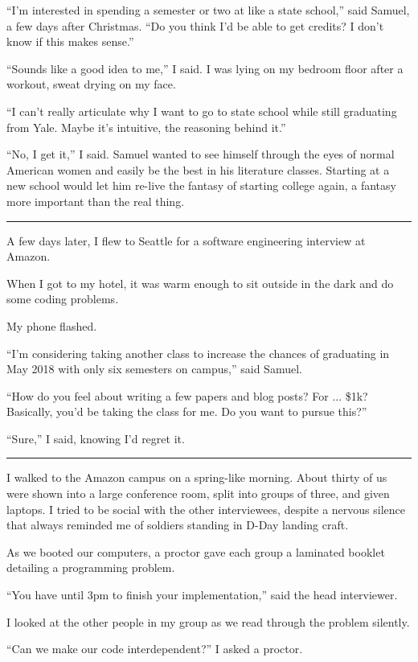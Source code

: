 ``I'm interested in spending a semester or two at like a state school,'' said
Samuel, a few days after Christmas.  ``Do you think I'd be able to get credits?
I don't know if this makes sense.''

``Sounds like a good idea to me,'' I said.  I was lying on my bedroom floor
after a workout, sweat drying on my face.

``I can't really articulate why I want to go to state school while still
graduating from Yale.   Maybe it's intuitive, the reasoning behind it.'' 

``No, I get it,'' I said.  Samuel wanted to see himself through the eyes of
normal American women and easily be the best in his literature classes.
Starting at a new school would let him re-live the fantasy of starting college
again, a fantasy more important than the real thing.

\plainfancybreak{12pt}{2}{* * *}

A few days later, I flew to Seattle for a software engineering interview at
Amazon.

When I got to my hotel, it was warm enough to sit outside in the dark and do
some coding problems.

My phone flashed.

``I'm considering taking another class to increase the chances of graduating in
May 2018 with only six semesters on campus,'' said Samuel.  

``How do you feel about writing a few papers and blog posts?  For ... \$1k?
Basically, you'd be taking the class for me.  Do you want to pursue this?'' 

``Sure,'' I said, knowing I'd regret it.

\plainfancybreak{12pt}{2}{* * *}

I walked to the Amazon campus on a spring-like morning.  About thirty of us were
shown into a large conference room, split into groups of three, and given
laptops.  I tried to be social with the other interviewees, despite a nervous
silence that always reminded me of soldiers standing in D-Day landing craft.

As we booted our computers, a proctor gave each group a laminated booklet
detailing a programming problem. 

``You have until 3pm to finish your implementation,'' said the head interviewer.

I looked at the other people in my group as we read through the problem
silently.

``Can we make our code interdependent?'' I asked a proctor.

